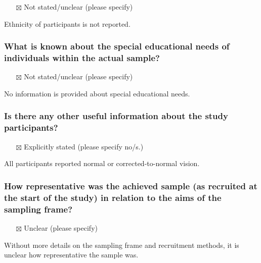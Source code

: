 \documentclass[
  doc, a4paper]{apa7}
\providecommand{\tightlist}{%
  \setlength{\itemsep}{0pt}\setlength{\parskip}{0pt}}
\begin{document}
\begin{itemize}
\tightlist
\item[$\boxtimes$]
  Not stated/unclear (please specify)
\end{itemize}

Ethnicity of participants is not reported.

\subsubsection{What is known about the special educational needs of individuals within the actual sample?}\label{what-is-known-about-the-special-educational-needs-of-individuals-within-the-actual-sample}

\begin{itemize}
\tightlist
\item[$\boxtimes$]
  Not stated/unclear (please specify)
\end{itemize}

No information is provided about special educational needs.

\subsubsection{Is there any other useful information about the study participants?}\label{is-there-any-other-useful-information-about-the-study-participants}

\begin{itemize}
\tightlist
\item[$\boxtimes$]
  Explicitly stated (please specify no/s.)
\end{itemize}

All participants reported normal or corrected-to-normal vision.

\subsubsection{How representative was the achieved sample (as recruited at the start of the study) in relation to the aims of the sampling frame?}\label{how-representative-was-the-achieved-sample-as-recruited-at-the-start-of-the-study-in-relation-to-the-aims-of-the-sampling-frame}

\begin{itemize}
\tightlist
\item[$\boxtimes$]
  Unclear (please specify)
\end{itemize}

Without more details on the sampling frame and recruitment methods, it is unclear how representative the sample was.
\end{document}
